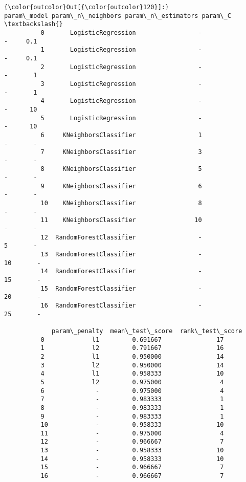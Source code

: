 \documentclass[8pt]{extarticle}
\begin{document}
\begin{Verbatim}[commandchars=\\\{\}]
{\color{outcolor}Out[{\color{outcolor}120}]:}                param\_model param\_n\_neighbors param\_n\_estimators param\_C  \textbackslash{}
          0       LogisticRegression                 -                  -     0.1   
          1       LogisticRegression                 -                  -     0.1   
          2       LogisticRegression                 -                  -       1   
          3       LogisticRegression                 -                  -       1   
          4       LogisticRegression                 -                  -      10   
          5       LogisticRegression                 -                  -      10   
          6     KNeighborsClassifier                 1                  -       -   
          7     KNeighborsClassifier                 3                  -       -   
          8     KNeighborsClassifier                 5                  -       -   
          9     KNeighborsClassifier                 6                  -       -   
          10    KNeighborsClassifier                 8                  -       -   
          11    KNeighborsClassifier                10                  -       -   
          12  RandomForestClassifier                 -                  5       -   
          13  RandomForestClassifier                 -                 10       -   
          14  RandomForestClassifier                 -                 15       -   
          15  RandomForestClassifier                 -                 20       -   
          16  RandomForestClassifier                 -                 25       -   
          
             param\_penalty  mean\_test\_score  rank\_test\_score  
          0             l1         0.691667               17  
          1             l2         0.791667               16  
          2             l1         0.950000               14  
          3             l2         0.950000               14  
          4             l1         0.958333               10  
          5             l2         0.975000                4  
          6              -         0.975000                4  
          7              -         0.983333                1  
          8              -         0.983333                1  
          9              -         0.983333                1  
          10             -         0.958333               10  
          11             -         0.975000                4  
          12             -         0.966667                7  
          13             -         0.958333               10  
          14             -         0.958333               10  
          15             -         0.966667                7  
          16             -         0.966667                7  
\end{Verbatim}
            
\end{document}
